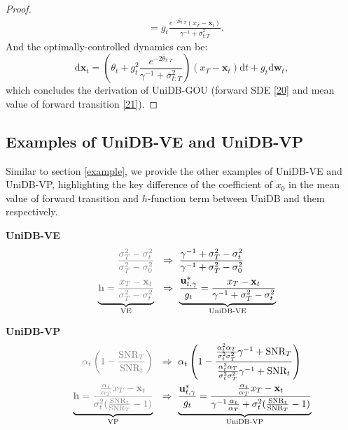 \begin{proof}
\begin{equation}
\begin{split}
&= g_t \frac{e^{-2\bar{\theta}_{t:T}} (x_T - \mathbf{x}_t)}{\gamma^{-1} + \bar{\sigma}^2_{t:T}}.
\end{split}
\end{equation}
And the optimally-controlled dynamics can be: 
\begin{equation}
\mathrm{d} \mathbf{x}_t = \left( \theta_t + g^2_t \frac{e^{-2\bar{\theta}_{t:T}}}{\gamma^{-1} + \bar{\sigma}^2_{t:T}}\right) (x_T - \mathbf{x}_t) \mathrm{d} t + g_t \mathrm{d} \mathbf{w}_t,
\end{equation}
which concludes the derivation of UniDB-GOU (forward SDE \eqref{20} and mean value of forward transition \eqref{21}).
\end{proof}


\subsection{Examples of UniDB-VE and UniDB-VP}\label{ve_vp_example}
Similar to section \ref{example}, we provide the other examples of UniDB-VE and UniDB-VP, highlighting the key difference of the coefficient of $x_0$ in the mean value of forward transition and $h$-function term between UniDB and them respectively. 

\textbf{UniDB-VE}
\begin{equation}
\begin{aligned}
\textcolor{gray} {\quad \quad \quad \frac{\sigma_T^2 - \sigma_t^2}{\sigma_T^2 - \sigma_0^2}} \ & \ \Rightarrow \ \frac{\gamma^{-1} + \sigma_T^2 - \sigma_t^2}{\gamma^{-1} + \sigma_T^2 - \sigma_0^2} \\
\underbrace{\textcolor{gray} {\mathbf{h} = \frac{x_T - \mathbf{x}_t}{\sigma_T^2 - \sigma_t^2}}}_{\text{VE}} \ & \ \Rightarrow \ \underbrace{\frac{\mathbf{u}_{t, \gamma}^{*}}{g_t} = \frac{x_T - \mathbf{x}_t}{\gamma^{-1} + \sigma_T^2 - \sigma_t^2}}_{\text{UniDB-VE}}
\end{aligned}
\end{equation}

\textbf{UniDB-VP}
\begin{equation}
\begin{aligned}
\textcolor{gray} {\quad \quad \quad \alpha_t\left(1 - \frac{\text{SNR}_T}{\text{SNR}_t}\right)} \ & \ \Rightarrow \ \alpha_t\left(1 - \frac{\frac{\alpha_t^2\alpha_T}{\sigma_t^2\sigma_T^2}\gamma^{-1}+\text{SNR}_T}{\frac{\alpha_t^2\alpha_T}{\sigma_t^2\sigma_T^2}\gamma^{-1}+\text{SNR}_t}\right) \\
\underbrace{\textcolor{gray} {\mathbf{h} = \frac{\frac{\alpha_t}{\alpha_T}x_T - \mathbf{x}_t}{\sigma_t^2(\frac{\text{SNR}_t}{\text{SNR}_T} - 1)}}}_{\text{VP}} \ & \ \Rightarrow \ \underbrace{\frac{\mathbf{u}_{t, \gamma}^{*}}{g_t} = \frac{\frac{\alpha_t}{\alpha_T}x_T - \mathbf{x}_t}{\gamma^{-1}\frac{\alpha_t}{\alpha_T} + \sigma_t^2(\frac{\text{SNR}_t}{\text{SNR}_T} - 1)}}_{\text{UniDB-VP}}
\end{aligned}
\end{equation}


